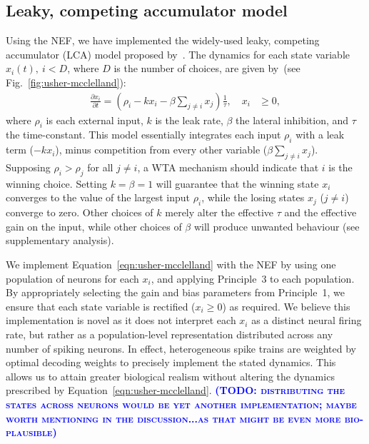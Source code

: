 \documentclass[10pt,letterpaper]{article}
\makeatletter
\newcommand{\todo}[1]{\textbf{\textsc{\textcolor{blue}{(TODO\@: #1)}}}}
\makeatother
\begin{document}
\subsection{Leaky, competing accumulator model}
Using the NEF, we have implemented the widely-used leaky, competing accumulator (LCA) model proposed by~.
The dynamics for each state variable $x_i(t),\ i < D$, where $D$ is the number of choices, are given by~(see Fig.~\ref{fig:usher-mcclelland}):
\begin{equation} \label{eqn:usher-mcclelland}
    \begin{split}
        \frac{{\partial x}_i}{\partial t} = \left(\rho_i - kx_i - \beta \sum_{j \neq i} x_j\right) \frac{1}{\tau}, \quad x_i &\ge 0,
    \end{split}
\end{equation}
where $\rho_i$ is each external input, $k$ is the leak rate, $\beta$ the lateral inhibition, and $\tau$ the time-constant.
This model essentially integrates each input $\rho_i$ with a leak term ($- kx_i$), minus competition from every other variable ($\beta \sum_{j \neq i} x_j$).
Supposing $\rho_i > \rho_j$ for all $j \ne i$, a WTA mechanism should indicate that $i$ is the winning choice.
Setting $k = \beta = 1$ will guarantee that the winning state $x_i$ converges to the value of the largest input $\rho_i$, while the losing states $x_j$ ($j \ne i$) converge to zero.
Other choices of $k$ merely alter the effective $\tau$ and the effective gain on the input, while other choices of $\beta$ will produce unwanted behaviour (see supplementary analysis).

We implement Equation~\ref{eqn:usher-mcclelland} with the NEF by using one population of neurons for each $x_i$, and applying Principle~3 to each population.
By appropriately selecting the gain and bias parameters from Principle~1, we ensure that each state variable is rectified ($x_i \ge 0$) as required.
We believe this implementation is novel as it does not interpret each $x_i$ as a distinct neural firing rate, but rather as a population-level representation distributed across any number of spiking neurons.
In effect, heterogeneous spike trains are weighted by optimal decoding weights to precisely implement the stated dynamics.
This allows us to attain greater biological realism without altering the dynamics prescribed by Equation~\ref{eqn:usher-mcclelland}.
\todo{distributing the states across neurons would be yet another implementation; maybe worth mentioning in the discussion...as that might be even more bio-plausible}
\end{document}

